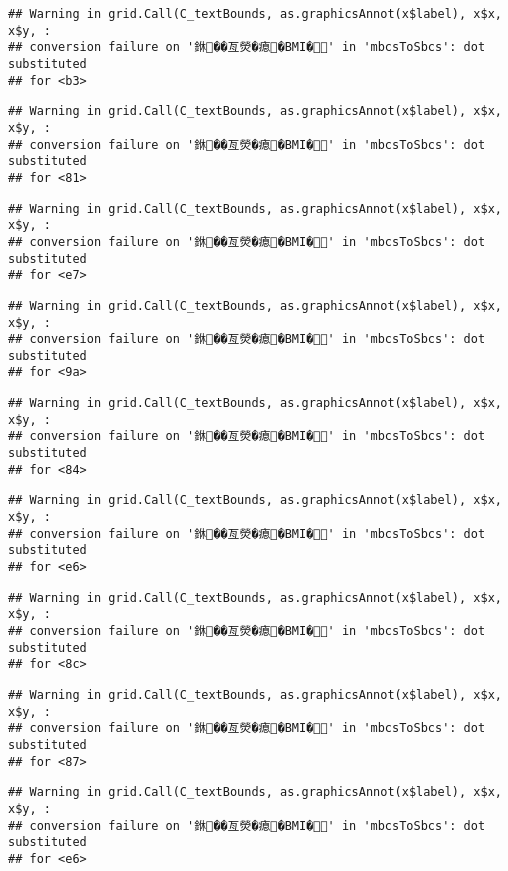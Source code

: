 \documentclass[
]{article}
\begin{document}
\begin{verbatim}
## Warning in grid.Call(C_textBounds, as.graphicsAnnot(x$label), x$x, x$y, :
## conversion failure on '銝��亙熒�瘜�BMI�' in 'mbcsToSbcs': dot substituted
## for <b3>
\end{verbatim}

\begin{verbatim}
## Warning in grid.Call(C_textBounds, as.graphicsAnnot(x$label), x$x, x$y, :
## conversion failure on '銝��亙熒�瘜�BMI�' in 'mbcsToSbcs': dot substituted
## for <81>
\end{verbatim}

\begin{verbatim}
## Warning in grid.Call(C_textBounds, as.graphicsAnnot(x$label), x$x, x$y, :
## conversion failure on '銝��亙熒�瘜�BMI�' in 'mbcsToSbcs': dot substituted
## for <e7>
\end{verbatim}

\begin{verbatim}
## Warning in grid.Call(C_textBounds, as.graphicsAnnot(x$label), x$x, x$y, :
## conversion failure on '銝��亙熒�瘜�BMI�' in 'mbcsToSbcs': dot substituted
## for <9a>
\end{verbatim}

\begin{verbatim}
## Warning in grid.Call(C_textBounds, as.graphicsAnnot(x$label), x$x, x$y, :
## conversion failure on '銝��亙熒�瘜�BMI�' in 'mbcsToSbcs': dot substituted
## for <84>
\end{verbatim}

\begin{verbatim}
## Warning in grid.Call(C_textBounds, as.graphicsAnnot(x$label), x$x, x$y, :
## conversion failure on '銝��亙熒�瘜�BMI�' in 'mbcsToSbcs': dot substituted
## for <e6>
\end{verbatim}

\begin{verbatim}
## Warning in grid.Call(C_textBounds, as.graphicsAnnot(x$label), x$x, x$y, :
## conversion failure on '銝��亙熒�瘜�BMI�' in 'mbcsToSbcs': dot substituted
## for <8c>
\end{verbatim}

\begin{verbatim}
## Warning in grid.Call(C_textBounds, as.graphicsAnnot(x$label), x$x, x$y, :
## conversion failure on '銝��亙熒�瘜�BMI�' in 'mbcsToSbcs': dot substituted
## for <87>
\end{verbatim}

\begin{verbatim}
## Warning in grid.Call(C_textBounds, as.graphicsAnnot(x$label), x$x, x$y, :
## conversion failure on '銝��亙熒�瘜�BMI�' in 'mbcsToSbcs': dot substituted
## for <e6>
\end{verbatim}
\end{document}
